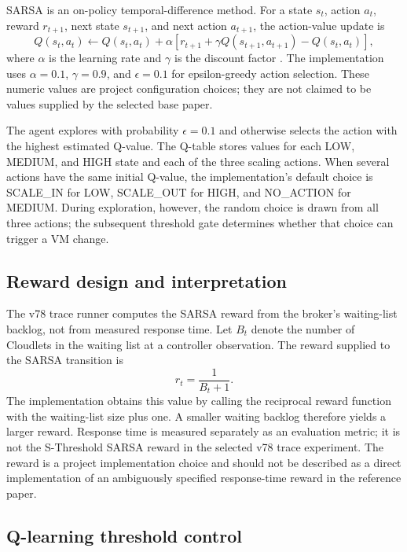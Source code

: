 \documentclass[pdflatex,sn-mathphys-num]{sn-jnl}
\begin{document}
SARSA is an on-policy temporal-difference method. For a state $s_t$, action $a_t$, reward $r_{t+1}$, next state $s_{t+1}$, and next action $a_{t+1}$, the action-value update is
\begin{equation}
Q(s_t,a_t)\leftarrow Q(s_t,a_t)+\alpha\left[r_{t+1}+\gamma Q(s_{t+1},a_{t+1})-Q(s_t,a_t)\right],
\label{eq:sarsa}
\end{equation}
where $\alpha$ is the learning rate and $\gamma$ is the discount factor \cite{sutton2018reinforcement}. The implementation uses $\alpha=0.1$, $\gamma=0.9$, and $\epsilon=0.1$ for epsilon-greedy action selection. These numeric values are project configuration choices; they are not claimed to be values supplied by the selected base paper.

The agent explores with probability $\epsilon=0.1$ and otherwise selects the action with the highest estimated Q-value. The Q-table stores values for each LOW, MEDIUM, and HIGH state and each of the three scaling actions. When several actions have the same initial Q-value, the implementation's default choice is SCALE\_IN for LOW, SCALE\_OUT for HIGH, and NO\_ACTION for MEDIUM. During exploration, however, the random choice is drawn from all three actions; the subsequent threshold gate determines whether that choice can trigger a VM change.

\subsection{Reward design and interpretation}

The v78 trace runner computes the SARSA reward from the broker's waiting-list backlog, not from measured response time. Let $B_t$ denote the number of Cloudlets in the waiting list at a controller observation. The reward supplied to the SARSA transition is
\begin{equation}
r_t=\frac{1}{B_t+1}.
\label{eq:reward}
\end{equation}
The implementation obtains this value by calling the reciprocal reward function with the waiting-list size plus one. A smaller waiting backlog therefore yields a larger reward. Response time is measured separately as an evaluation metric; it is not the S-Threshold SARSA reward in the selected v78 trace experiment. The reward is a project implementation choice and should not be described as a direct implementation of an ambiguously specified response-time reward in the reference paper.

\subsection{Q-learning threshold control}
\end{document}
